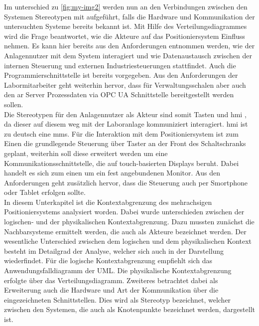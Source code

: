 \documentclass[../Bachelorarbeit.tex]{subfiles}
\begin{document}
Im unterschied zu \autoref{fig:my-img2} werden nun an den Verbindungen zwischen den Systemen Stereotypen mit aufgeführt, falls die Hardware und Kommunikation der untersuchten Systeme bereits bekannt ist. Mit Hilfe des Verteilungsdiagrammes wird die Frage beantwortet, wie die Akteure auf das Positioniersystem Einfluss nehmen. Es kann hier bereits aus den Anforderungen entnommen werden, wie der Anlagennutzer mit dem System interagiert und wie Datenaustausch zwischen der internen Steuerung und externen Industriesteuerungen stattfindet. Auch die Programmierschnittstelle ist bereits vorgegeben. Aus den Anforderungen der Labormitarbeiter geht weiterhin hervor, dass für Verwaltungsschalen aber auch den \ac{ar} Server Prozessdaten via OPC UA Schnittstelle bereitgestellt werden sollen.\\
Die Stereotypen für \zB den Anlagennutzer als Akteur sind somit \glqq Tasten\grqq{} und \glqq \acs{hmi} \grqq{}, da dieser auf diesem weg mit der Laboranlage kommuniziert \bzw interagiert. \ac{hmi} ist zu deutsch eine \ac{mms}. Für die Interaktion mit dem Positioniersystem ist zum Einen die grundlegende Steuerung über Taster an der Front des Schaltschranks geplant, weiterhin soll diese erweitert werden um eine Kommunikationsschnittstelle, die auf touch-basierten Displays beruht. Dabei handelt es sich zum einen um ein fest angebundenen Monitor. Aus den Anforderungen geht zusätzlich hervor, dass die Steuerung auch per Smortphone oder Tablet erfolgen sollte.\\
\bigskip
\newline
In diesem Unterkapitel ist die Kontextabgrenzung des mehrachsigen Positioniersystems analysiert worden. Dabei wurde unterschieden zwischen der logischen- und der physikalischen Kontextabgrenzung. Dazu mussten zunächst die Nachbarsysteme ermittelt werden, die auch als Akteure bezeichnet werden. Der wesentliche Unterschied zwischen dem logischen und dem physikalischen Kontext besteht im Detailgrad der Analyse, welcher sich auch in der Darstellung wiederfindet. Für die logische Kontextabgrenzung empfiehlt sich das Anwendungsfalldiagramm der UML. Die physikalische Kontextabgrenzung erfolgte über das Verteilungsdiagramm. Zweiteres betrachtet dabei als Erweiterung auch die Hardware und Art der Kommunikation über die eingezeichneten Schnittstellen. Dies wird als Stereotyp bezeichnet, welcher zwischen den Systemen, die auch als Knotenpunkte bezeichnet werden, dargestellt ist.
\end{document}
